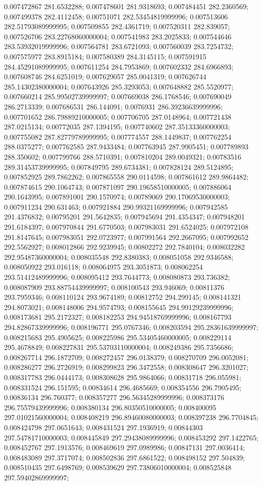 0.007472867 281.6532288; 0.007478601 281.9318693; 0.007484451 282.2360569; 0.007499378 282.4112458; 0.00751071 282.53454819999996; 0.007513606 282.51793089999995; 0.007509855 282.4361719; 0.007520311 282.839057; 0.007526706 283.22768060000004; 0.007541983 283.2025833; 0.007544646 283.53932019999996; 0.007564781 283.6721093; 0.007560039 283.7254732; 0.007575977 283.8915184; 0.007580389 284.3145115; 0.007591915 284.45291089999995; 0.007611254 284.7953869; 0.007602332 284.6966893; 0.007608746 284.6251019; 0.007629057 285.0041319; 0.007626744 285.14302380000004; 0.007643926 285.3293053; 0.007648882 285.5520977; 0.007660214 285.99502739999997; 0.007669038 286.1768546; 0.007690049 286.2713339; 0.007686531 286.144091; 0.0076931 286.39236639999996; 0.007701652 286.79889210000005; 0.007706705 287.0148964; 0.007721438 287.0215134; 0.00772035 287.1394195; 0.007740602 287.35133360000003; 0.007755082 287.82779789999995; 0.007774557 288.1449837; 0.007762254 288.0375277; 0.007762585 287.9433484; 0.007763945 287.9905451; 0.007789893 288.350602; 0.007799766 288.5710391; 0.007810204 289.0049321; 0.00783516 289.31453739999995; 0.007849795 289.6734381; 0.007828124 289.5124895; 0.007852925 289.7862262; 0.007865558 290.0114598; 0.007861612 289.9864482; 0.007874615 290.1064743; 0.007871097 290.19658510000005; 0.007886064 290.1643995; 0.007891001 290.1570974; 0.00789069 290.17069530000003; 0.007911234 290.631463; 0.007921884 290.99321169999996; 0.007942585 291.4376832; 0.00795201 291.5642835; 0.007945694 291.4354347; 0.007948201 291.6184397; 0.007970844 291.6770503; 0.007983031 291.6524025; 0.007972108 291.8147645; 0.007983051 292.0723977; 0.007991564 292.2667095; 0.007992652 292.5562927; 0.008012866 292.9239945; 0.00802272 292.7840104; 0.008032282 292.95487360000004; 0.008035548 292.8380383; 0.008051058 292.9346588; 0.008050922 293.016118; 0.008064975 293.3051873; 0.008062254 293.51412489999996; 0.008095412 293.7644773; 0.008080873 293.736382; 0.008087909 293.88754439999997; 0.008100543 293.946069; 0.00811376 293.7959346; 0.008110124 293.9674189; 0.00812752 294.299145; 0.008141321 294.8073021; 0.008148006 294.9574793; 0.008155645 294.99129239999996; 0.008173681 295.2172327; 0.008182253 294.94518769999996; 0.008167793 294.82867339999996; 0.008196771 295.0767346; 0.008203594 295.28361639999997; 0.008215683 295.4905625; 0.008225986 295.53405460000005; 0.008229114 295.4678849; 0.008227831 295.53703110000004; 0.008249386 295.7356686; 0.008267714 296.1872709; 0.008272457 296.0138379; 0.008270709 296.0052081; 0.008286277 296.2726919; 0.008299823 296.3472558; 0.008308647 296.3201027; 0.008317783 296.0444173; 0.008308628 295.9864066; 0.00831718 296.055981; 0.008331524 296.151595; 0.00834614 296.4685669; 0.008354556 296.7905495; 0.00836134 296.760377; 0.008357277 296.56345289999996; 0.008373176 296.75579439999996; 0.008380134 296.80350510000005; 0.008400095 297.01021560000004; 0.008408219 296.89460080000003; 0.008397238 296.7704845; 0.008424798 297.0651643; 0.008431524 297.1936919; 0.00844303 297.54781710000003; 0.008445849 297.29438089999996; 0.008453292 297.1422765; 0.008452767 297.1913576; 0.008469619 297.0989986; 0.00847131 297.0036414; 0.008483089 297.3717074; 0.008502836 297.6861522; 0.008498152 297.504839; 0.008510435 297.6498769; 0.008539629 297.73806010000004; 0.008525848 297.59402869999997; 